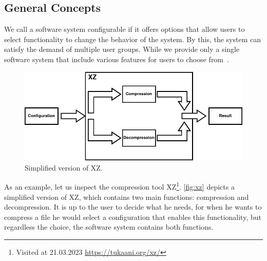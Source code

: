\subsection{General Concepts}\label{ch:general-concepts}
We call a software system configurable if it offers options that allow users to select functionality to change the behavior of the system. %
By this, the system can satisfy the demand of multiple user groups. 
While we provide only a single software system that include various features for users to choose from~\cite{TooManyKnobs}.


\begin{figure}[h]
    \centering
    \includegraphics[scale=0.55]{gfx/ConfigurableSystemXZ.png}
    \caption{Simplified version of \textsc{XZ}.}
    \label{fig:xz}
\end{figure}

As an example, let us inspect the compression tool \textsc{XZ}\footnote{Visited at 21.03.2023 \url{https://tukaani.org/xz/}}.
\autoref{fig:xz} depicts a simplified version of \textsc{XZ}, which contains two main functions: compression and decompression. 
It is up to the user to decide what he needs, for when he wants to compress a file he would select a configuration that enables this functionality,
but regardless the choice, the software system contains both functions.
